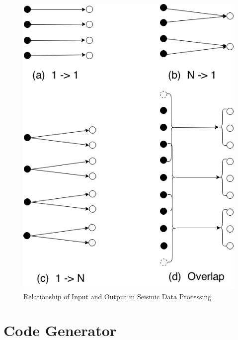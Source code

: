 \begin{figure}[H]
\centering
\includegraphics[scale=.50]{figures/template.png}
\caption{Relationship of Input and Output in Seismic Data Processing}
\label{Template}
\end{figure}

\section{Code Generator}


